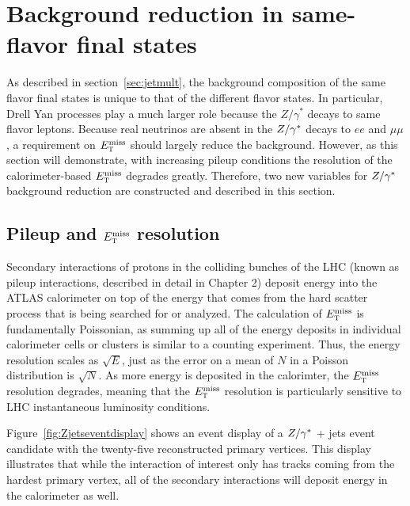 \section{Background reduction in same-flavor final states}

As described in section~\ref{sec:jetmult}, the background composition of the same flavor final states is unique to that of the different flavor states. In particular, Drell Yan processes play a much larger role because the $Z/\gamma^{*}$ decays to same flavor leptons. Because real neutrinos are absent in the $Z/\gamma^{\ast}$ decays to $ee$ and $\mu\mu$, a requirement on $E_{\textrm{\footnotesize\sc t}}^{\rm miss}$ should largely reduce the background. However, as this section will demonstrate, with increasing pileup conditions the resolution of the calorimeter-based $E_{\textrm{\footnotesize\sc t}}^{\rm miss}$ degrades greatly. Therefore, two new variables for $Z/\gamma^{\ast}$ background reduction are constructed and described in this section.

\subsection{Pileup and $E_{\textrm{\footnotesize\sc t}}^{\rm miss}$ resolution}

Secondary interactions of protons in the colliding bunches of the LHC (known as pileup interactions, described in detail in Chapter 2) deposit energy into the ATLAS calorimeter on top of the energy that comes from the hard scatter process that is being searched for or analyzed. The calculation of $E_{\textrm{\footnotesize\sc t}}^{\rm miss}$ is fundamentally Poissonian, as summing up all of the energy deposits in individual calorimeter cells or clusters is similar to a counting experiment. Thus, the energy resolution scales as $\sqrt{E}$, just as the error on a mean of $N$ in a Poisson distribution is $\sqrt{N}$. As more energy is deposited in the calorimter, the $E_{\textrm{\footnotesize\sc t}}^{\rm miss}$ resolution degrades, meaning that the $E_{\textrm{\footnotesize\sc t}}^{\rm miss}$ resolution is particularly sensitive to LHC instantaneous luminosity conditions. 

Figure~\ref{fig:Zjetseventdisplay} shows an event display of a $Z/\gamma^{\ast}$ + jets event candidate with the twenty-five reconstructed primary vertices. This display illustrates that while the interaction of interest only has tracks coming from the hardest primary vertex, all of the secondary interactions will deposit energy in the calorimeter as well.


